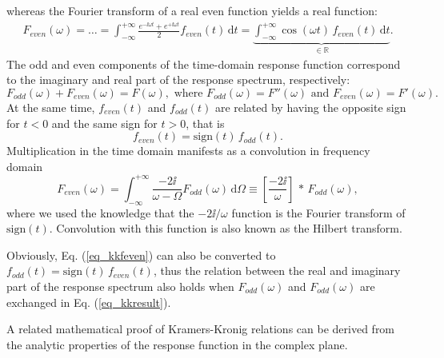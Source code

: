whereas the Fourier transform of a real even function yields a real function:
\begin{equation} 
\begin{split} 
F_{even}(\omega)= \ldots =   \int_{-\infty}^{+\infty} \frac{e^{-\ii \omega t}+e^{+\ii \omega t}}{2} f_{even}(t) \,\mbox{d}t 
		 = \underbrace{\int_{-\infty}^{+\infty} \cos(\omega t) \, f_{even}(t) \,\mbox{d}t}_{\mbox{$\in \mathbb{R}$}}.
\end{split} 
\label{eq_kkFeven}\end{equation}
The odd and even components of the time-domain response function correspond to the imaginary and real part of the response spectrum, respectively:
\begin{equation} F_{odd}(\omega) + F_{even}(\omega) = F(\omega), \text{ where } F_{odd}(\omega) = F''(\omega) \text{ and } F_{even}(\omega) = F'(\omega).  \label{eq_kkFodd}\end{equation}
At the same time, $f_{even}(t)$ and $f_{odd}(t)$ are related by having the opposite sign for $t<0$ and the same sign for $t>0$, that is 
\begin{equation} f_{even}(t) = \mbox{sign}(t)\,f_{odd}(t). \label{eq_kkfeven}\end{equation}
Multiplication in the time domain manifests as a convolution in frequency domain
\begin{equation} 
F_{even}(\omega) = \int_{-\infty}^{+\infty}  \frac{-2\ii}{\omega - \Omega} F_{odd}(\omega) \,\mbox{d}\Omega  \equiv  \left[\frac{-2\ii}{\omega}\right]\,\ast\,F_{odd}(\omega),
\label{eq_kkresult}\end{equation} 
where we used the knowledge that the $-2\ii/\omega$ function is the Fourier transform of $\mbox{sign}(t)$. Convolution with this function is also known as the Hilbert transform.%

Obviously, Eq. (\ref{eq_kkfeven}) can also be converted to $f_{odd}(t) = \mbox{sign}(t)\,f_{even}(t)$, thus the relation between the real and imaginary part of the response spectrum also holds when $F_{odd}(\omega)$ and $F_{odd}(\omega)$ are exchanged in Eq. (\ref{eq_kkresult}). 

A related mathematical proof of Kramers-Kronig relations can be derived from the analytic properties of the response function in the complex plane.

